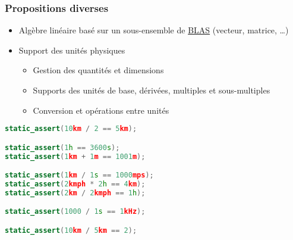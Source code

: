 \documentclass[C++.tex]{subfiles}
\begin{document}
\begin{frame}[fragile]
	\frametitle{Propositions diverses}
	\begin{itemize}
		\item Algèbre linéaire basé sur un sous-ensemble de \href{https://www.netlib.org/blas/}{BLAS} (vecteur, matrice, \ldots)
		\item Support des unités physiques
		\begin{itemize}
			\item Gestion des quantités et dimensions
			\item Supports des unités de base, dérivées, multiples et sous-multiples
			\item Conversion et opérations entre unités
		\end{itemize}
	\end{itemize}

	\begin{lstlisting}[language=C++]
static_assert(10km / 2 == 5km);

static_assert(1h == 3600s);
static_assert(1km + 1m == 1001m);

static_assert(1km / 1s == 1000mps);
static_assert(2kmph * 2h == 4km);
static_assert(2km / 2kmph == 1h);

static_assert(1000 / 1s == 1kHz);

static_assert(10km / 5km == 2);\end{lstlisting}
\end{frame}
\end{document}
